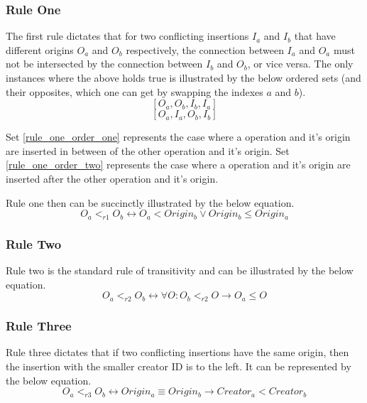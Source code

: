 \documentclass[12pt]{article}
\begin{document}
  \subsubsection{Rule One}
  The first rule dictates that for two conflicting insertions \(I_{a}\) and \(I_{b}\) that have different origins \(O_{a}\) and \(O_{b}\) respectively,
  the connection between \(I_{a}\) and \(O_{a}\) must not be intersected by the connection between \(I_{b}\) and \(O_{b}\), or vice versa.
  The only instances where the above holds true is illustrated by the below ordered sets (and their opposites, which one can get by swapping the indexes \(a\) and \(b\)).
  \begin{equation} \label{rule_one_order_one}
    [O_{a}, O_{b}, I_{b}, I_{a}]
  \end{equation}
  \begin{equation} \label{rule_one_order_two}
    [O_{a}, I_{a}, O_{b}, I_{b}]
  \end{equation}

  Set \ref{rule_one_order_one} represents the case where a operation and it's origin are inserted in between of the other operation and it's origin.
  Set \ref{rule_one_order_two} represents the case where a operation and it's origin are inserted after the other operation and it's origin.

  Rule one then can be succinctly illustrated by the below equation.
  \begin{equation} \label{rule_one_equation}
    O_{a} <_{r1} O_{b} \leftrightarrow O_{a} < Origin_{b} \lor Origin_{b} \leq Origin_{a}
  \end{equation}

  \subsubsection{Rule Two}
  Rule two is the standard rule of transitivity and can be illustrated by the below equation.
  \begin{equation} \label{rule_two_equation}
    O_{a} <_{r2} O_{b} \leftrightarrow \forall O: O_{b} <_{r2} O \rightarrow O_{a} \leq O
  \end{equation}

  \subsubsection{Rule Three}
  Rule three dictates that if two conflicting insertions have the same origin, then the insertion with the smaller creator ID is to the left.
  It can be represented by the below equation.
  \begin{equation} \label{rule_three_equation}
    O_{a} <_{r3} O_{b} \leftrightarrow Origin_{a} \equiv Origin_{b} \rightarrow Creator_{a} < Creator_{b}
  \end{equation}
\end{document}
